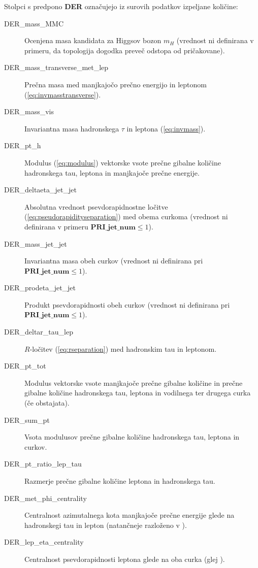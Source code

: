 \documentclass[11pt,a4paper,openany]{book}
\begin{document}
Stolpci s predpono \textbf{DER} označujejo iz surovih podatkov izpeljane količine:
\begin{changemargin}{0.5cm}{0.0cm} 
\begin{description}
	\item[DER\_mass\_MMC] Ocenjena masa kandidata za Higgsov bozon $m_H$ (vrednost ni definirana v primeru, da topologija dogodka preveč odstopa od pričakovane).
	\item[DER\_mass\_transverse\_met\_lep] Prečna masa med manjkajočo prečno energijo in leptonom (\ref{eq:invmasstransverse}).
	\item[DER\_mass\_vis] Invariantna masa hadronskega $\tau$ in leptona (\ref{eq:invmass}).
	\item[DER\_pt\_h] Modulus (\ref{eq:modulus}) vektorske vsote prečne gibalne količine hadronskega tau, leptona in manjkajoče prečne energije.
	\item[DER\_deltaeta\_jet\_jet] Absolutna vrednost psevdorapidnostne ločitve (\ref{eq:pseudorapidityseparation}) med obema curkoma (vrednost ni definirana v primeru $\textbf{PRI\_jet\_num} \le 1$).
	\item[DER\_mass\_jet\_jet] Invariantna masa obeh curkov (vrednost ni definirana pri \\
		$\textbf{PRI\_jet\_num} \le 1$).
	\item[DER\_prodeta\_jet\_jet] Produkt psevdorapidnosti obeh curkov (vrednost ni definirana pri $\textbf{PRI\_jet\_num} \le 1$).
	\item[DER\_deltar\_tau\_lep] $R$-ločitev (\ref{eq:rseparation}) med hadronskim tau in leptonom.
	\item[DER\_pt\_tot] Modulus vektorske vsote manjkajoče prečne gibalne količine in prečne gibalne količine hadronskega tau, leptona in vodilnega ter drugega curka (če obstajata).
	\item[DER\_sum\_pt] Vsota modulusov prečne gibalne količine hadronskega tau, leptona in curkov.
	\item[DER\_pt\_ratio\_lep\_tau] Razmerje prečne gibalne količine leptona in hadronskega tau.
	\item[DER\_met\_phi\_centrality] Centralnost azimutalnega kota manjkajoče prečne energije glede na hadronskegi tau in lepton (natančneje razloženo v \cite{ChallengeDoc}).
	\item[DER\_lep\_eta\_centrality] Centralnost psevdorapidnosti leptona glede na oba curka (glej \cite{ChallengeDoc}).
	
\end{description}
\end{changemargin}
\end{document}
